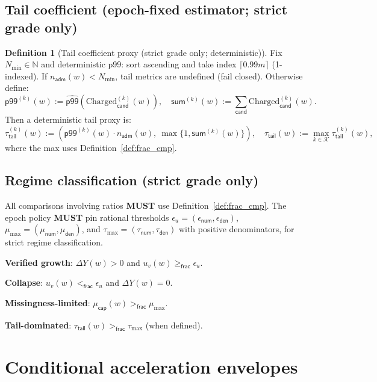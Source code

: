 \documentclass[11pt]{article}
\newcommand{\MUST}{\textbf{MUST}}
\newcommand{\N}{\mathbb{N}}
\newcommand{\1}{\mathbf{1}}
\theoremstyle{definition}
\newtheorem{definition}{Definition}
\theoremstyle{plain}
\begin{document}
\subsection{Tail coefficient (epoch-fixed estimator; strict grade only)}
\begin{definition}[Tail coefficient proxy (strict grade only; deterministic)]
\label{def:tail_proxy}
Fix $N_{\min}\in\N$ and deterministic p99: sort ascending and take index $\lceil 0.99 m\rceil$ (1-indexed). If $n_{\textsf{adm}}(w)<N_{\min}$, tail metrics are undefined (fail closed). Otherwise define:
\[
\textsf{p99}^{(k)}(w):=\widehat{\textsf{p99}}\left(\mathrm{Charged}^{(k)}_{\textsf{cand}}(w)\right),\quad
\textsf{sum}^{(k)}(w):=\sum_{\textsf{cand}}\mathrm{Charged}^{(k)}_{\textsf{cand}}(w).
\]
Then a deterministic tail proxy is:
\[
\tau_{\textsf{tail}}^{(k)}(w):=
\left(\textsf{p99}^{(k)}(w)\cdot n_{\textsf{adm}}(w),\ \max\{1,\textsf{sum}^{(k)}(w)\}\right),
\quad
\tau_{\textsf{tail}}(w):=\max_{k\in\mathcal{K}} \tau_{\textsf{tail}}^{(k)}(w),
\]
where the max uses Definition~\ref{def:frac_cmp}.
\end{definition}

\subsection{Regime classification (strict grade only)}
All comparisons involving ratios \MUST{} use Definition~\ref{def:frac_cmp}.
The epoch policy \MUST{} pin rational thresholds $\epsilon_u=(\epsilon_{\textsf{num}},\epsilon_{\textsf{den}})$, $\mu_{\max}=(\mu_{\textsf{num}},\mu_{\textsf{den}})$, and $\tau_{\max}=(\tau_{\textsf{num}},\tau_{\textsf{den}})$ with positive denominators, for strict regime classification.
\begin{tightitemize}
\item \textbf{Verified growth}: $\Delta Y(w)>0$ and $u_v(w)\ge_{\textsf{frac}}\epsilon_u$.
\item \textbf{Collapse}: $u_v(w)<_{\textsf{frac}}\epsilon_u$ and $\Delta Y(w)=0$.
\item \textbf{Missingness-limited}: $\mu_{\textsf{cap}}(w)>_{\textsf{frac}}\mu_{\max}$.
\item \textbf{Tail-dominated}: $\tau_{\textsf{tail}}(w)>_{\textsf{frac}}\tau_{\max}$ (when defined).
\end{tightitemize}

\section{Conditional acceleration envelopes}
\label{sec:accel}
\end{document}

